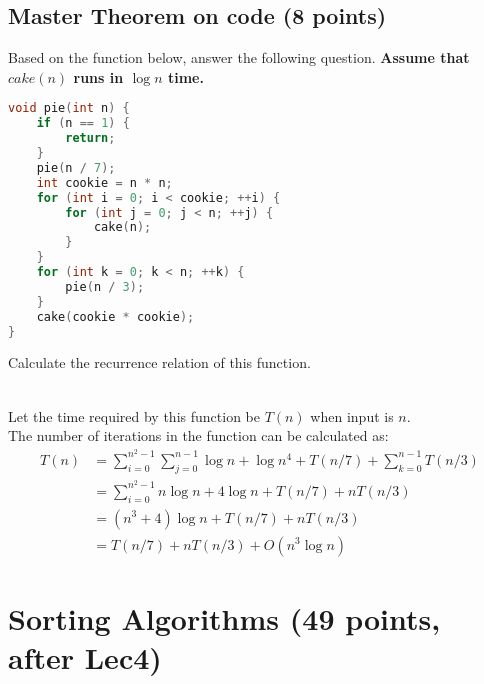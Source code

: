 \documentclass[11pt]{exam}
\begin{document}
\subsection{Master Theorem on code (8 points)}
Based on the function below, answer the following question. \textbf{Assume that $cake(n)$ runs in $\log n$ time.}
\begin{lstlisting}[language=c++]
void pie(int n) {
	if (n == 1) {
		return;
	}
	pie(n / 7);
	int cookie = n * n;
	for (int i = 0; i < cookie; ++i) {
		for (int j = 0; j < n; ++j) {
			cake(n);
		}
	}
	for (int k = 0; k < n; ++k) {
		pie(n / 3);
	}
	cake(cookie * cookie);
}
\end{lstlisting}
Calculate the recurrence relation of this function.
\begin{solution}
\\
Let the time required by this function be $T(n)$ when input is $n$. \\
The number of iterations in the function can be calculated as:
\begin{equation*}
    \begin{aligned}
    T(n) &=\sum_{i=0}^{n^{2}-1} \sum_{j=0}^{n-1} \log n + \log n^{4} + T(n/7) + \sum_{k=0}^{n-1} T(n/3) \\
    &=\sum_{i=0}^{n^{2}-1} n \log n +4 \log n + T(n/7) + n T(n/3) \\
    &=(n^{3}+4) \log n + T(n/7) + n T(n/3) \\
    &=T(n/7) + n T(n/3) + O(n^{3}\log n)
    \end{aligned}
\end{equation*}
\end{solution}
\newpage
\section{Sorting Algorithms (49 points, after Lec4)}
\end{document}

